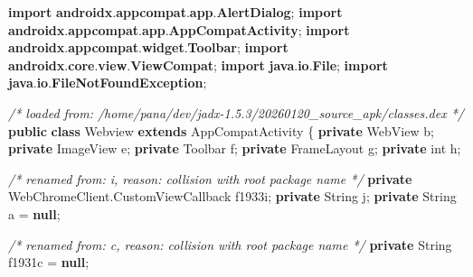 \documentclass[
]{article}
\newenvironment{Shaded}{}{}
\newcommand{\BuiltInTok}[1]{\textcolor[rgb]{0.00,0.50,0.00}{#1}}
\newcommand{\CommentTok}[1]{\textcolor[rgb]{0.38,0.63,0.69}{\textit{#1}}}
\newcommand{\DataTypeTok}[1]{\textcolor[rgb]{0.56,0.13,0.00}{#1}}
\newcommand{\FunctionTok}[1]{\textcolor[rgb]{0.02,0.16,0.49}{#1}}
\newcommand{\ImportTok}[1]{\textcolor[rgb]{0.00,0.50,0.00}{\textbf{#1}}}
\newcommand{\KeywordTok}[1]{\textcolor[rgb]{0.00,0.44,0.13}{\textbf{#1}}}
\newcommand{\NormalTok}[1]{#1}
\newcommand{\OperatorTok}[1]{\textcolor[rgb]{0.40,0.40,0.40}{#1}}
\begin{document}
\begin{Shaded}
\begin{Highlighting}[]
\KeywordTok{import} \ImportTok{androidx}\OperatorTok{.}\ImportTok{appcompat}\OperatorTok{.}\ImportTok{app}\OperatorTok{.}\ImportTok{AlertDialog}\OperatorTok{;}
\KeywordTok{import} \ImportTok{androidx}\OperatorTok{.}\ImportTok{appcompat}\OperatorTok{.}\ImportTok{app}\OperatorTok{.}\ImportTok{AppCompatActivity}\OperatorTok{;}
\KeywordTok{import} \ImportTok{androidx}\OperatorTok{.}\ImportTok{appcompat}\OperatorTok{.}\ImportTok{widget}\OperatorTok{.}\ImportTok{Toolbar}\OperatorTok{;}
\KeywordTok{import} \ImportTok{androidx}\OperatorTok{.}\ImportTok{core}\OperatorTok{.}\ImportTok{view}\OperatorTok{.}\ImportTok{ViewCompat}\OperatorTok{;}
\KeywordTok{import} \ImportTok{java}\OperatorTok{.}\ImportTok{io}\OperatorTok{.}\ImportTok{File}\OperatorTok{;}
\KeywordTok{import} \ImportTok{java}\OperatorTok{.}\ImportTok{io}\OperatorTok{.}\ImportTok{FileNotFoundException}\OperatorTok{;}

\CommentTok{/* loaded from: /home/pana/dev/jadx{-}1.5.3/20260120\_source\_apk/classes.dex */}
\KeywordTok{public} \KeywordTok{class}\NormalTok{ Webview }\KeywordTok{extends}\NormalTok{ AppCompatActivity }\OperatorTok{\{}
    \KeywordTok{private}\NormalTok{ WebView b}\OperatorTok{;}
    \KeywordTok{private} \BuiltInTok{ImageView}\NormalTok{ e}\OperatorTok{;}
    \KeywordTok{private}\NormalTok{ Toolbar f}\OperatorTok{;}
    \KeywordTok{private}\NormalTok{ FrameLayout g}\OperatorTok{;}
    \KeywordTok{private} \DataTypeTok{int}\NormalTok{ h}\OperatorTok{;}

    \CommentTok{/* renamed from: i, reason: collision with root package name */}
    \KeywordTok{private}\NormalTok{ WebChromeClient}\OperatorTok{.}\FunctionTok{CustomViewCallback}\NormalTok{ f1933i}\OperatorTok{;}
    \KeywordTok{private} \BuiltInTok{String}\NormalTok{ j}\OperatorTok{;}
    \KeywordTok{private} \BuiltInTok{String}\NormalTok{ a }\OperatorTok{=} \KeywordTok{null}\OperatorTok{;}

    \CommentTok{/* renamed from: c, reason: collision with root package name */}
    \KeywordTok{private} \BuiltInTok{String}\NormalTok{ f1931c }\OperatorTok{=} \KeywordTok{null}\OperatorTok{;}


\end{Highlighting}
\end{Shaded}
\end{document}
